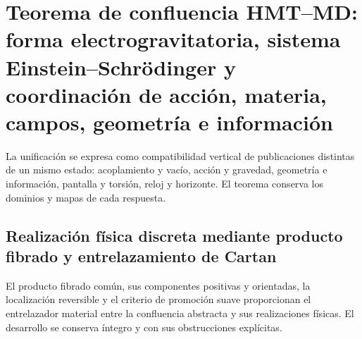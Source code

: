 \chapter{Teorema de confluencia HMT–MD: forma electrogravitatoria, sistema Einstein–Schrödinger y coordinación de acción, materia, campos, geometría e información}
\label{chap:parte-iv-51}

La unificación se expresa como compatibilidad vertical de publicaciones distintas de un mismo estado: acoplamiento y vacío, acción y gravedad, geometría e información, pantalla y torsión, reloj y horizonte. El teorema conserva los dominios y mapas de cada respuesta.



\section{Realización física discreta mediante producto fibrado y entrelazamiento de Cartan}

El producto fibrado común, sus componentes positivas y orientadas, la
localización reversible y el criterio de promoción suave proporcionan el
entrelazador material entre la confluencia abstracta y sus realizaciones
físicas. El desarrollo se conserva íntegro y con sus obstrucciones explícitas.

\begingroup
\let\chapter\section
\let\section\subsection
\let\subsection\subsubsection
\let\subsubsection\paragraph
\let\clearpage\relax
\let\cleardoublepage\relax

\endgroup

